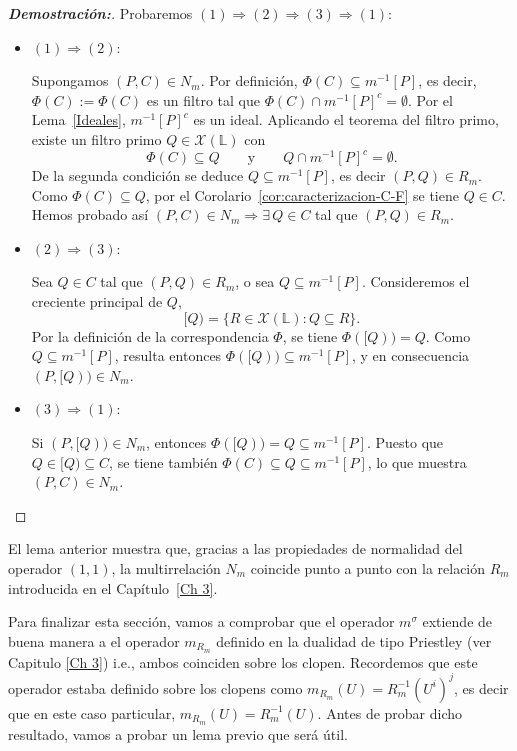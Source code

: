 \documentclass[12pt]{book}
\begin{document}
\begin{proof}[\textbf{Demostración:}]
Probaremos $(1)\Rightarrow(2)\Rightarrow (3)\Rightarrow (1)$:
\begin{itemize}
    \item $(1)\Rightarrow(2)$:
    
Supongamos $(P,C)\in N_m$.  
Por definición, $\Phi(C)\subseteq m^{-1}[P]$, es decir,
$\Phi(C):=\Phi(C)$ es un filtro tal que
$\Phi(C)\cap m^{-1}[P]^c=\emptyset$.
Por el Lema~\ref{Ideales}, $m^{-1}[P]^c$ es un ideal.
Aplicando el teorema del filtro primo, existe un filtro primo
$Q\in\mathcal{X}(\mathbb L)$ con
\[
\Phi(C)\subseteq Q
\qquad\text{y}\qquad
Q\cap m^{-1}[P]^c=\emptyset.
\]
De la segunda condición se deduce $Q\subseteq m^{-1}[P]$,
es decir $(P,Q)\in R_m$.
Como $\Phi(C)\subseteq Q$, por el Corolario~\ref{cor:caracterizacion-C-F} se tiene $Q\in C$.
Hemos probado así $(P,C)\in N_m\Rightarrow\exists\,Q\in C$ tal que $(P,Q)\in R_m$.

\item $(2)\Rightarrow (3)$:

Sea $Q\in C$ tal que $(P,Q)\in R_m$, o sea $Q\subseteq m^{-1}[P]$.
Consideremos el creciente principal de $Q$,
\[
[Q)=\{R\in\mathcal{X}(\mathbb L):Q\subseteq R\}.
\]
Por la definición de la correspondencia $\Phi$, se tiene
$\Phi([Q))=Q$.
Como $Q\subseteq m^{-1}[P]$, resulta entonces
$\Phi([Q))\subseteq m^{-1}[P]$, 
y en consecuencia $(P,[Q))\in N_m$.

\item $(3)\Rightarrow (1)$: 

Si $(P,[Q))\in N_m$, entonces 
$\Phi([Q))=Q\subseteq m^{-1}[P]$.
Puesto que $Q\in [Q)\subseteq C$,
se tiene también $\Phi(C)\subseteq Q\subseteq m^{-1}[P]$,
lo que muestra $(P,C)\in N_m$.
\end{itemize}
\end{proof}
El lema anterior muestra que, gracias a las propiedades de normalidad del operador $(1,1)$, la multirrelación $N_m$ coincide punto a punto con la relación $R_m$ introducida en el
Capítulo~\ref{Ch 3}.

\vspace{0.2cm}

Para finalizar esta sección, vamos a comprobar que el operador $m^{\sigma}$ extiende de buena manera a el operador $m_{R_{m}}$ definido en la dualidad de tipo Priestley (ver Capitulo \ref{Ch 3}) i.e., ambos coinciden sobre los clopen. Recordemos que este operador estaba definido sobre los clopens como $m_{R_m}(U)=R_m^{-1}(U^i)^j$, es decir que en este caso particular, $m_{R_m}(U)=R_m^{-1}(U)$. Antes de probar dicho resultado, vamos a probar un lema previo que será útil.
\end{document}
